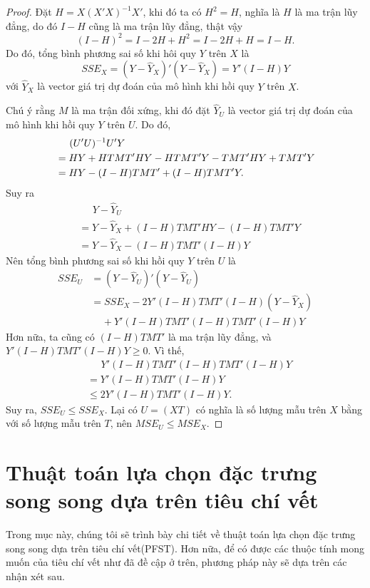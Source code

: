 \begin{proof}
	Đặt $H = X(X'X)^{-1}X'$, khi đó ta có $H^2 = H$, nghĩa là $H$ là ma trận lũy đẳng, do đó $I-H$ cũng là ma trận lũy đẳng, thật vậy
	\begin{equation*}
		(I-H)^2 = I - 2H + H^2 = I - 2H + H = I-H.
	\end{equation*}
	Do đó, tổng bình phương sai số khi hôi quy $Y$ trên $X$ là
	\begin{equation*}
		SSE_X = (Y-\hat{Y}_X)'(Y-\hat{Y}_X)
		= Y'(I-H)Y
	\end{equation*}
	với $\hat{Y}_X$ là vector giá trị dự đoán của mô hình khi hồi quy $Y$ trên $X$.
	
	Chú ý rằng $M$ là ma trận đối xứng, khi đó đặt $\hat{Y}_U$ là vector giá trị dự đoán của mô hình khi hồi quy $Y$ trên $U$. Do đó, 
	\begin{align*}
		\small
		&\;\;\;\;\;(U'U)^{-1}U'Y \\
		&= HY+HTMT'HY-HTMT'Y - TMT'HY+TMT'Y\\
		&= HY-(I-H)TMT'+(I-H)TMT'Y.
	\end{align*}
	Suy ra
	\begin{align*}
		&\;\;\;\;\;Y-\hat{Y}_U \\
		&= Y-\hat{Y}_X+(I-H)TMT'HY-(I-H)TMT'Y\\
		&= Y- \hat{Y}_X-(I-H)TMT'(I-H)Y
	\end{align*}
	Nên tổng bình phương sai số khi hồi quy $Y$ trên $U$ là
	\begin{align*}
		SSE_U &= (Y-\hat{Y}_U)'(Y-\hat{Y}_U)\\
		&= SSE_X-2Y'(I-H)TMT'(I-H)(Y-\hat{Y}_X)\\
		&\;\;\;\;+Y'(I-H)TMT'(I-H)TMT'(I-H)Y
	\end{align*}
	Hơn nữa, ta cũng có $(I-H)TMT'$ là ma trận lũy đẳng, và $Y'(I-H)TMT'(I-H)Y\ge 0$. Vì thế, 
	\begin{align*}
		&\;\;\;\;\;Y'(I-H)TMT'(I-H)TMT'(I-H)Y\\
		&=Y'(I-H)TMT'(I-H)Y\\
		&\le 2Y'(I-H)TMT'(I-H)Y.
	\end{align*}
	Suy ra, $SSE_U\le SSE_X$. Lại có $U = (X T)$ có nghĩa là số lượng mẫu trên $X$ bằng với số lượng mẫu trên $T$, nên $MSE_U\le MSE_X$.
\end{proof}

\section{Thuật toán lựa chọn đặc trưng song song dựa trên tiêu chí vết}\label{methods}
Trong mục này, chúng tôi sẽ trình bày chi tiết về thuật toán lựa chọn đặc trưng song song dựa trên tiêu chí vết(PFST). Hơn nữa, để có được các thuộc tính mong muốn của tiêu chí vết như đã đề cập ở trên, phương pháp này sẽ dựa trên các nhận xét sau.

